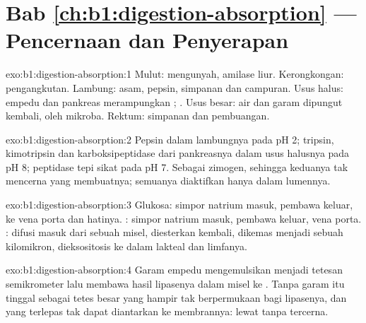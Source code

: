 \section*{Bab \ref{ch:b1:digestion-absorption} --- Pencernaan dan Penyerapan}

\begin{solution}{exo:b1:digestion-absorption:1}
Mulut: mengunyah, amilase liur. Kerongkongan: pengangkutan. Lambung:
asam, pepsin, simpanan dan campuran. Usus halus: empedu dan 
pankreas merampungkan ; . Usus besar: air dan
garam dipungut kembali,  oleh mikroba. Rektum: simpanan dan
pembuangan.
\end{solution}

\begin{solution}{exo:b1:digestion-absorption:2}
Pepsin dalam lambungnya pada pH 2; tripsin, kimotripsin dan
karboksipeptidase dari pankreasnya dalam usus halusnya pada pH 8;
peptidase tepi sikat pada pH 7. Sebagai zimogen, sehingga keduanya tak
mencerna  yang membuatnya; semuanya diaktifkan hanya dalam lumennya.
\end{solution}

\begin{solution}{exo:b1:digestion-absorption:3}
Glukosa: simpor natrium masuk, pembawa keluar, ke vena porta dan
hatinya. : simpor natrium masuk, pembawa keluar, vena porta.
: difusi masuk dari sebuah misel, diesterkan kembali, dikemas
menjadi sebuah kilomikron, dieksositosis ke dalam lakteal dan limfanya.
\end{solution}

\begin{solution}{exo:b1:digestion-absorption:4}
Garam empedu mengemulsikan  menjadi tetesan semikrometer lalu
membawa hasil lipasenya dalam misel ke . Tanpa garam itu
 tinggal sebagai tetes besar yang hampir tak berpermukaan bagi
lipasenya, dan  yang terlepas tak dapat diantarkan ke
membrannya:  lewat tanpa tercerna.
\end{solution}

